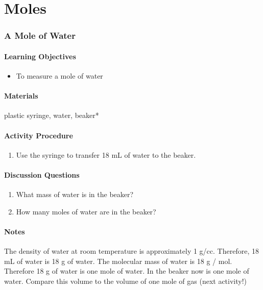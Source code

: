 \chapter{Moles}

\subsection{A Mole of Water}

\subsubsection*{Learning Objectives}
\begin{itemize}
\item{To measure a mole of water}
\end{itemize}

\subsubsection*{Materials}
plastic syringe, water, beaker*

\subsubsection*{Activity Procedure}
\begin{enumerate}
\item{Use the syringe to transfer 18 mL of water to the beaker.}
\end{enumerate}

\subsubsection*{Discussion Questions}
\begin{enumerate}
\item{What mass of water is in the beaker?}
\item{How many moles of water are in the beaker?}
\end{enumerate}

\subsubsection*{Notes}
The density of water at room temperature is approximately 1 g/cc. Therefore, 18 mL of water is 18 g of water. The molecular mass of water is 18 g / mol. Therefore 18 g of water is one mole of water. In the beaker now is one mole of water. Compare this volume to the volume of one mole of gas (next activity!)

